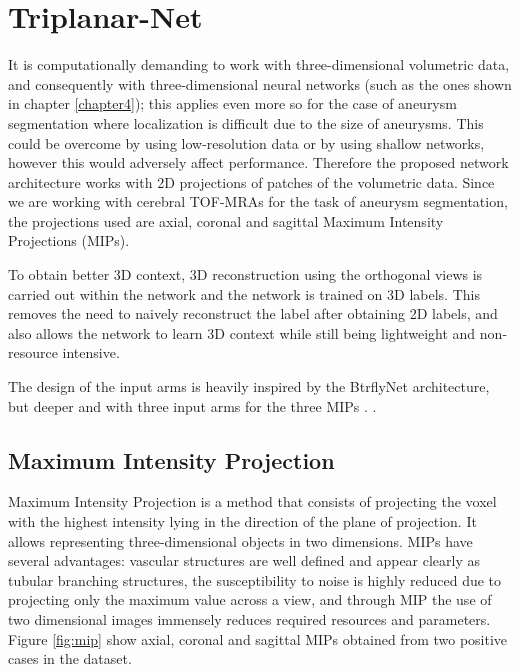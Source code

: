 \chapter{Triplanar-Net}
\label{chapter5}

It is computationally demanding to work with three-dimensional volumetric data, and consequently with three-dimensional neural networks (such as the ones shown in chapter \ref{chapter4}); this applies even more so for the case of aneurysm segmentation where localization is difficult due to the size of aneurysms. This could be overcome by using low-resolution data or by using shallow networks, however this would adversely affect performance. Therefore the proposed network architecture works with 2D projections of patches of the volumetric data. Since we are working with cerebral TOF-MRAs for the task of aneurysm segmentation, the projections used are axial, coronal and sagittal Maximum Intensity Projections (MIPs). 

To obtain better 3D context, 3D reconstruction using the orthogonal views is carried out within the network and the network is trained on 3D labels. This removes the need to naively reconstruct the label after obtaining 2D labels, and also allows the network to learn 3D context while still being lightweight and non-resource intensive. 

The design of the input arms is heavily inspired by the BtrflyNet architecture, but deeper and with three input arms for the three MIPs \cite{sekuboyina2018}.   . 


\section{Maximum Intensity Projection}
Maximum Intensity Projection is a method that consists of projecting the voxel with the highest intensity lying in the direction of the plane of projection. It allows representing three-dimensional objects in two dimensions. MIPs have several advantages: vascular structures are well defined and appear clearly as tubular branching structures, the susceptibility to noise is highly reduced due to projecting only the maximum value across a view, and through MIP the use of two dimensional images immensely reduces required resources and parameters. Figure \ref{fig:mip} show axial, coronal and sagittal MIPs obtained from two positive cases in the dataset. 

